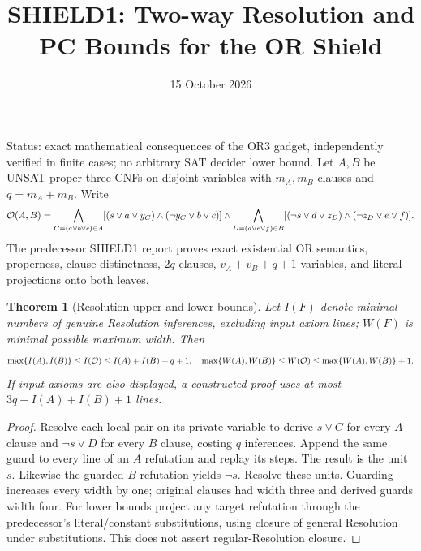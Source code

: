 \documentclass{article}
\title{SHIELD1: Two-way Resolution and PC Bounds for the OR Shield}
\date{15 October 2026}
\newtheorem{theorem}{Theorem}
\begin{document}
\maketitle
\noindent Status: exact mathematical consequences of the OR3 gadget, independently verified in finite cases; no arbitrary SAT decider lower bound.
Let $A,B$ be UNSAT proper three-CNFs on disjoint variables with $m_A,m_B$ clauses and $q=m_A+m_B$. Write
\[
{\cal O}(A,B)=\bigwedge_{C=(a\vee b\vee c)\in A}[(s\vee a\vee y_C)\wedge(\neg y_C\vee b\vee c)]
\wedge\bigwedge_{D=(d\vee e\vee f)\in B}[(\neg s\vee d\vee z_D)\wedge(\neg z_D\vee e\vee f)].
\]
The predecessor SHIELD1 report proves exact existential OR semantics, properness, clause distinctness, $2q$ clauses, $v_A+v_B+q+1$ variables, and literal projections onto both leaves.

\begin{theorem}[Resolution upper and lower bounds]
Let $I(F)$ denote minimal numbers of genuine Resolution inferences, excluding input axiom lines; $W(F)$ is minimal possible maximum width. Then
\[
\max\{I(A),I(B)\}\le I({\cal O})\le I(A)+I(B)+q+1,
\quad
\max\{W(A),W(B)\}\le W({\cal O})\le\max\{W(A),W(B)\}+1.
\]
If input axioms are also displayed, a constructed proof uses at most $3q+I(A)+I(B)+1$ lines.
\end{theorem}
\begin{proof}
Resolve each local pair on its private variable to derive $s\vee C$ for every $A$ clause and $\neg s\vee D$ for every $B$ clause, costing $q$ inferences. Append the same guard to every line of an $A$ refutation and replay its steps. The result is the unit $s$. Likewise the guarded $B$ refutation yields $\neg s$. Resolve these units. Guarding increases every width by one; original clauses had width three and derived guards width four. For lower bounds project any target refutation through the predecessor's literal/constant substitutions, using closure of general Resolution under substitutions. This does not assert regular-Resolution closure.
\end{proof}
\end{document}
